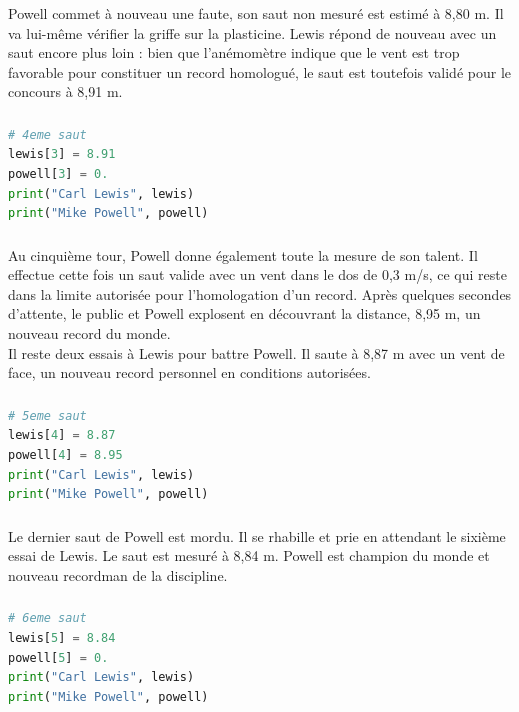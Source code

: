 \documentclass[svgnames,11pt]{beamer}
\begin{document}
\begin{frame}
    \frametitle{}

    Powell commet à nouveau une faute, son saut non mesuré est estimé à 8,80 m. Il va lui-même vérifier la griffe sur la plasticine. Lewis répond de nouveau avec un saut encore plus loin : bien que l'anémomètre indique que le vent est trop favorable pour constituer un record homologué, le saut est toutefois validé pour le concours à 8,91 m.

\end{frame}
\begin{frame}[fragile]
    \frametitle{}

    \begin{lstlisting}[language=Python , basicstyle=\ttfamily\small, xleftmargin=2em, xrightmargin=2em]
# 4eme saut
lewis[3] = 8.91
powell[3] = 0.
print("Carl Lewis", lewis)
print("Mike Powell", powell)
\end{lstlisting}

\end{frame}
\begin{frame}
    \frametitle{}

    Au cinquième tour, Powell donne également toute la mesure de son talent. Il effectue cette fois un saut valide avec un vent dans le dos de 0,3 m/s, ce qui reste dans la limite autorisée pour l'homologation d'un record. Après quelques secondes d'attente, le public et Powell explosent en découvrant la distance, 8,95 m, un nouveau record du monde.\\
    Il reste deux essais à Lewis pour battre Powell. Il saute à 8,87 m avec un vent de face, un nouveau record personnel en conditions autorisées.

\end{frame}
\begin{frame}[fragile]
    \frametitle{}

    \begin{lstlisting}[language=Python , basicstyle=\ttfamily\small, xleftmargin=2em, xrightmargin=2em]
# 5eme saut
lewis[4] = 8.87
powell[4] = 8.95
print("Carl Lewis", lewis)
print("Mike Powell", powell)
\end{lstlisting}

\end{frame}
\begin{frame}
    \frametitle{}

    Le dernier saut de Powell est mordu. Il se rhabille et prie en attendant le sixième essai de Lewis. Le saut est mesuré à 8,84 m. Powell est champion du monde et nouveau recordman de la discipline.

\end{frame}
\begin{frame}[fragile]
    \frametitle{}

    \begin{lstlisting}[language=Python , basicstyle=\ttfamily\small, xleftmargin=2em, xrightmargin=2em]
# 6eme saut
lewis[5] = 8.84
powell[5] = 0.
print("Carl Lewis", lewis)
print("Mike Powell", powell)
\end{lstlisting}

\end{frame}
\end{document}
